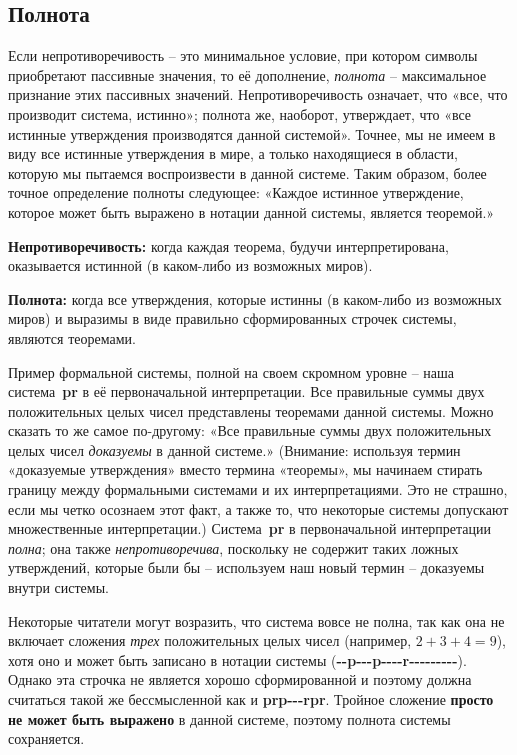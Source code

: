 \documentclass[../main.tex]{subfiles}
\begin{document}
\subsection{Полнота}

Если непротиворечивость \--- это минимальное условие, при котором символы приобретают пассивные значения, то её дополнение, \emph{полнота} \--- максимальное признание этих пассивных значений. Непротиворечивость означает, что «все, что производит система, истинно»; полнота же, наоборот, утверждает, что «все истинные утверждения производятся данной системой». Точнее, мы не имеем в виду все истинные утверждения в мире, а только находящиеся в области, которую мы пытаемся воспроизвести в данной системе. Таким образом, более точное определение полноты следующее: «Каждое истинное утверждение, которое может быть выражено в нотации данной системы, является теоремой.»

\begin{block}
    \textbf{Непротиворечивость:}
    когда каждая теорема, будучи интерпретирована, оказывается истинной (в каком-либо из возможных миров).

    \textbf{Полнота:}
    когда все утверждения, которые истинны (в каком-либо из возможных миров) и выразимы в виде правильно сформированных строчек системы, являются теоремами.
\end{block}

Пример формальной системы, полной на своем скромном уровне \--- наша система~\textbf{pr} в её первоначальной интерпретации. Все правильные суммы двух положительных целых чисел представлены теоремами данной системы. Можно сказать то же самое по-другому: «Все правильные суммы двух положительных целых чисел \emph{доказуемы} в данной системе.» (Внимание: используя термин «доказуемые утверждения» вместо термина «теоремы», мы начинаем стирать границу между формальными системами и их интерпретациями. Это не страшно, если мы четко осознаем этот факт, а также то, что некоторые системы допускают множественные интерпретации.) Система~\textbf{pr} в первоначальной интерпретации \emph{полна}; она также \emph{непротиворечива}, поскольку не содержит таких ложных утверждений, которые были бы \--- используем наш новый термин \--- доказуемы внутри системы.

Некоторые читатели могут возразить, что система вовсе не полна, так как она не включает сложения \emph{трех} положительных целых чисел (например, $2+3+4=9$), хотя оно и может быть записано в нотации системы (\textbf{-{}-p-{}-{}-p-{}-{}-{}-r-{}-{}-{}-{}-{}-{}-{}-{}-}).
Однако эта строчка не является хорошо сформированной и поэтому должна считаться такой же бессмысленной как и \textbf{prp-{}-{}-rpr}.
Тройное сложение \textbf{просто не может быть выражено} в данной системе, поэтому полнота системы сохраняется.
\end{document}
